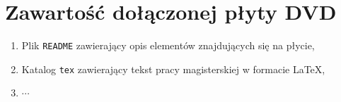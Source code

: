 \chapter{Zawartość dołączonej płyty DVD}

\begin{enumerate}
  \item Plik \texttt{README} zawierający opis elementów znajdujących się na płycie,
  \item Katalog \texttt{tex} zawierający tekst pracy magisterskiej w formacie \LaTeX,
  \item $\cdots$
\end{enumerate}